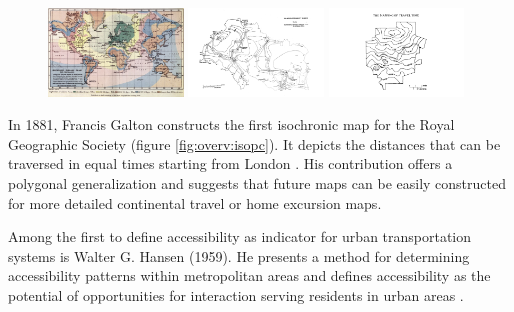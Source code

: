     \begin{figure}[ht]
      {\includegraphics[width=0.32\textwidth]{./img/overv-isopc.jpg}}
      \hfill
      {\includegraphics[width=0.32\textwidth]{./img/overv-nodac.png}}
      \hfill
      {\includegraphics[width=0.32\textwidth]{./img/overv-maptt.png}}
      \label{fig:overv:1}
    \end{figure}

    In 1881, Francis Galton constructs the first isochronic map for the Royal
    Geographic Society (figure \ref{fig:overv:isopc}). It depicts the
    distances that can be traversed in equal times starting from London
    \cite{galton1881construction}. His contribution offers a polygonal
    generalization and suggests that future maps can be easily constructed for
    more detailed continental travel or home excursion maps.\par

    Among the first to define accessibility as indicator for urban
    transportation systems is Walter G. Hansen (1959). He presents a method for
    determining accessibility patterns within metropolitan areas and defines
    accessibility as the potential of opportunities for interaction serving
    residents in urban areas \cite{hansen1959accessibility}.\par

